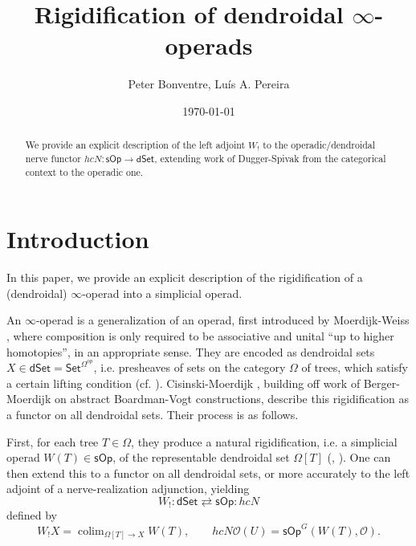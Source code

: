 \documentclass[a4paper,10pt
,draft
]{article}%
\title{Rigidification of dendroidal $\infty$-operads}
\author{Peter Bonventre, Lu\'is A. Pereira}%
\date{\today}
\numberwithin{equation}{section}
\numberwithin{figure}{section}
\theoremstyle{definition} %
\newcommand{\Set}{\ensuremath{\mathsf{Set}}}
\newcommand{\sOp}{\ensuremath{\mathsf{sOp}}}%
\newcommand{\dSet}{\mathsf{dSet}}
\DeclareMathOperator{\colim}{colim}%
\renewcommand{\O}{\ensuremath{\mathcal O}}
\newcommand{\1}{\ensuremath{\mathbbm 1}}%
\begin{document}
\maketitle

\begin{abstract}
        We provide an explicit description of the left adjoint $W_!$
        to the operadic/dendroidal nerve functor
        $hc N \colon \sOp \to \dSet$,
        extending work of Dugger-Spivak from the categorical context to the operadic one.
\end{abstract}

\tableofcontents


\section{Introduction}

In this paper, we provide an explicit description of the rigidification of a (dendroidal) $\infty$-operad into a simplicial operad.

An $\infty$-operad is a generalization of an operad, first introduced by Moerdijk-Weiss \cite{MW07}, where
composition is only required to be associative and unital ``up to higher homotopies'', in an appropriate sense.
They are encoded as dendroidal sets $X \in \dSet = \Set^{\Omega^{op}}$,
i.e. presheaves of sets on the category $\Omega$ of trees,
which satisfy a certain lifting condition (cf. \cite[\S 2.1]{CM11}).
Cisinski-Moerdijk \cite[\S 4]{CM13b},
building off work of Berger-Moerdijk \cite{BM06,BM07} on abstract Boardman-Vogt constructions,
describe this rigidification as a functor on all dendroidal sets.
Their process is as follows.

First, for each tree $T \in \Omega$, they produce a natural rigidification,
i.e. a simplicial operad $W(T) \in \sOp$,
of the representable dendroidal set $\Omega[T]$
(\cite[Rem. 7.3]{MW09}, \cite[Eq. (4.2.1)]{CM13b}).
One can then extend this to a functor on all dendroidal sets,
or more accurately to the left adjoint of a nerve-realization adjunction,
yielding
\begin{equation}
        \label{SOPDSET_EQ}
        W_! \colon \dSet \rightleftarrows \sOp \colon h c N           
\end{equation}
defined by
\begin{equation}
        \label{WXDEF_EQ}
        W_!X = \colim_{\Omega[T] \to X}W(T),
        \qquad
        hcN\O(U) = \sOp^G(W(T), \O).
\end{equation}
\end{document}
